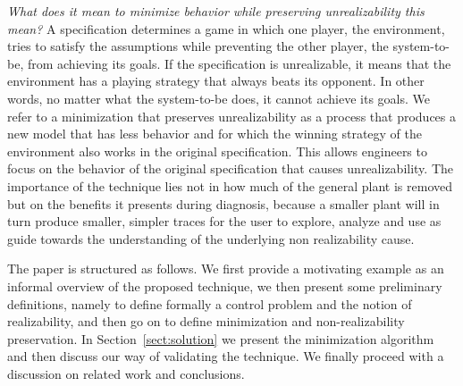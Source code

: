 \textit{What does it mean to minimize behavior while preserving unrealizability this mean?} A specification determines a game in which one player, the environment, tries to satisfy the assumptions while preventing the other player, the system-to-be, from achieving its goals. If the specification is unrealizable, it means that the environment has a playing strategy that always beats its opponent. In other words, no matter what the system-to-be does, it cannot achieve its goals. We refer to a minimization that preserves unrealizability as a process that produces a new model that has less behavior and for which the winning strategy of the environment also works in the original specification. This allows engineers to focus on the behavior of the original specification that causes unrealizability. The importance of the technique lies not in how much of the general plant is removed but on the benefits it presents during diagnosis, because a smaller plant will in turn produce smaller, simpler traces for the user to explore, analyze and use as guide towards the understanding of the underlying non realizability cause.




The paper is structured as follows. We first provide a motivating example as an informal overview of the proposed technique, we then present some preliminary definitions, namely to define formally a control problem and the notion of realizability, and then go on to define minimization and non-realizability preservation. In Section~\ref{sect:solution} we present the minimization algorithm and then discuss our way of validating the technique. We finally proceed with a discussion on related work and conclusions.